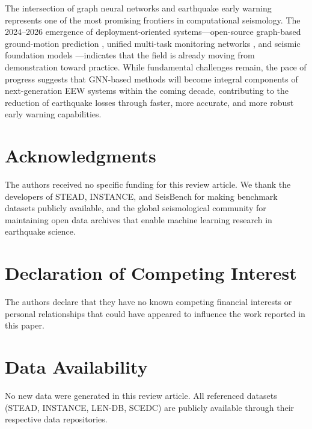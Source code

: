 \documentclass[review,authoryear]{elsarticle}
\begin{document}
The intersection of graph neural networks and earthquake early warning represents one of the most promising frontiers in computational seismology. The 2024--2026 emergence of deployment-oriented systems---open-source graph-based ground-motion prediction \citep{clements2024grapes}, unified multi-task monitoring networks \citep{si2024plan}, and seismic foundation models \citep{liu2024seislm}---indicates that the field is already moving from demonstration toward practice. While fundamental challenges remain, the pace of progress suggests that GNN-based methods will become integral components of next-generation EEW systems within the coming decade, contributing to the reduction of earthquake losses through faster, more accurate, and more robust early warning capabilities.

\section*{Acknowledgments}

The authors received no specific funding for this review article. We thank the developers of STEAD, INSTANCE, and SeisBench for making benchmark datasets publicly available, and the global seismological community for maintaining open data archives that enable machine learning research in earthquake science.

\section*{Declaration of Competing Interest}

The authors declare that they have no known competing financial interests or personal relationships that could have appeared to influence the work reported in this paper.

\section*{Data Availability}

No new data were generated in this review article. All referenced datasets (STEAD, INSTANCE, LEN-DB, SCEDC) are publicly available through their respective data repositories.



\end{document}
